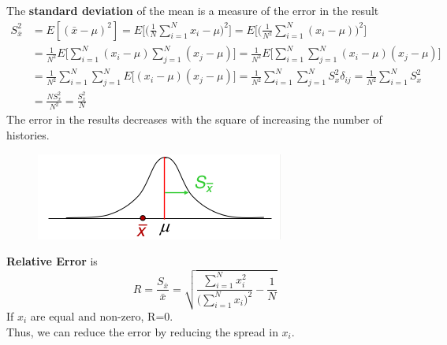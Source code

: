 \documentclass[12pt]{article}
\begin{document}
The \textbf{standard deviation} of the mean is a measure of the error in the result
\begin{align*}
S_{\bar{x}}^2 &= E[(\bar{x} - \mu)^2] = E\biggl[ \biggl(\frac{1}{N}\sum_{i=1}^N x_i - \mu\biggr)^2\biggr] = E\biggl[ \biggl(\frac{1}{N^2}\sum_{i=1}^N (x_i - \mu)\biggr)^2\biggr]\\
%
&=\frac{1}{N^2} E\biggl[ \sum_{i=1}^N (x_i - \mu) \sum_{j=1}^N (x_j - \mu)\biggr] = \frac{1}{N^2} E\biggl[ \sum_{i=1}^N \sum_{j=1}^N (x_i - \mu)  (x_j - \mu)\biggr]\\
%
&= \frac{1}{N^2} \sum_{i=1}^N \sum_{j=1}^N E\bigl[  (x_i - \mu)  (x_j - \mu)\bigr] = \frac{1}{N^2} \sum_{i=1}^N \sum_{j=1}^N S^2_x \delta_{ij} = \frac{1}{N^2} \sum_{i=1}^N S_x^2 \\
%
&= \frac{N S_x^2}{N^2} = \boxed{\frac{S_x^2}{N}}
\end{align*}
The error in the results decreases with the square of increasing the number of histories.
%
\begin{figure}[h!]
\begin{center}
  \includegraphics[height=1 in,clip]{../figs/gaussian}
\end{center}
  \label{fig:gaussian}
\end{figure}

\textbf{Relative Error} is 
\[
R = \frac{S_{\bar{x}}}{\bar{x}} = \sqrt{\frac{\sum_{i=1}^N x_i^2}{\bigl(\sum_{i=1}^N x_i\bigr)^2} - \frac{1}{N}} 
\]
If $x_i$ are equal and non-zero, R=0.\\
Thus, we can reduce the error by reducing the spread in $x_i$.
\end{document}
